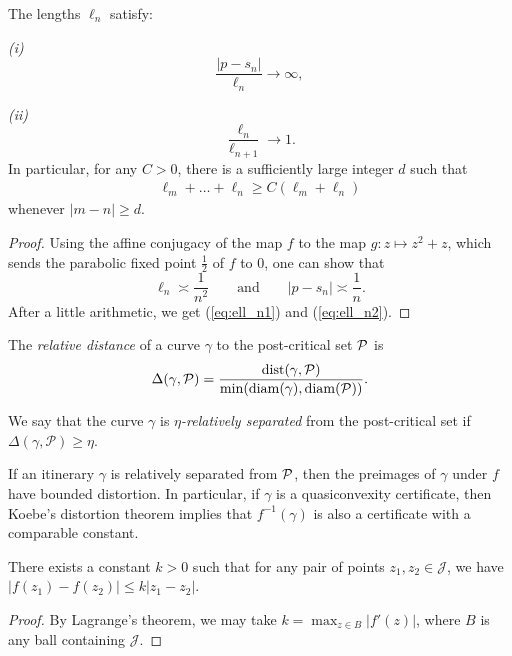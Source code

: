\begin{lemma} \label{lem-ell_n}
	The lengths ${\ell_n}$ satisfy:
	
	{\em (i)}
	\begin{equation}
	\label{eq:ell_n1}
		\frac {|p-s_n|}{\ell_n} \to \infty,
	\end{equation}
	
	{\em (ii)}
	\begin{equation}
	\label{eq:ell_n2}
		\frac{\ell_n}{\ell_{n+1}} \to 1.
	\end{equation}
	In particular, for any $C > 0$, there is a sufficiently large integer $d$ such that
	\begin{align*}
		\ell_{m}+\ldots+\ell_{n} \geq C (\ell_m+\ell_n)
	\end{align*}
	whenever $|m-n| \geq d$.
\end{lemma}

\begin{proof}
Using the affine conjugacy of the map $f$ to the map $g: z\mapsto z^2+z$, which sends the parabolic fixed point $\frac{1}{2}$ of $f$ to $0$, one can show that
$$
\ell_n \asymp \frac{1}{n^2} \qquad \text{and} \qquad |p - s_n| \asymp \frac{1}{n}.
$$
After a little arithmetic, we get (\ref{eq:ell_n1}) and (\ref{eq:ell_n2}).
\end{proof}

\begin{definition}
The \emph{relative distance} of a curve $\gamma$ to the post-critical set $\operatorname{\mathcal P}$ is 
$$
\Delta (\gamma, \mathcal P) = \frac {\operatorname{dist}(\gamma, \mathcal P)}{\min (\operatorname{diam} (\gamma), \operatorname{diam} (\mathcal P))}.
$$

We say that the curve $\gamma$ is \emph{$\eta$-relatively separated} from the post-critical set if $\Delta (\gamma, \mathcal P) \geq \eta$.  
\end{definition}
 
If an itinerary $\gamma$ is relatively separated from $\operatorname{\mathcal P}$, then the preimages of $\gamma$ under $f$ have bounded distortion. In particular, if $\gamma$ is a quasiconvexity certificate, then Koebe's distortion theorem implies that $f^{-1}(\gamma)$ is also a certificate with a comparable constant.

\begin{lemma}
There exists a constant $k>0$ such that for any pair of points $z_1, z_2 \in \mathcal J$, we have $|f(z_1)-f(z_2)| \leq k|z_1-z_2|$.
\end{lemma}

\begin{proof}
By Lagrange's theorem, we may take $k=\max_{z \in B} |f'(z)|$, where $B$ is any ball containing $\mathcal J$. 
\end{proof}
 
